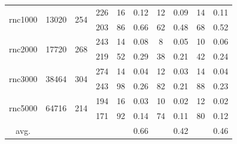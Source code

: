 \documentclass[conference]{IEEEtran}
\begin{document}
\begin{table}[!h]
\begin{tabular}{c|c|c|c|c|c|c|c|c|c}
\hline
\multicolumn{1}{c|}{\multirow{2}{*}{\hspace*{-1em}rnc1000\hspace*{-1em}}}         &\multicolumn{1}{c|}{\multirow{2}{*}{\hspace*{-1em}13020\hspace*{-1em}}}     &\multicolumn{1}{c|}{\multirow{2}{*}{254}}   &226    &16 &0.12  &12   &0.09  &14  &0.11   \\
   &  &   &203   &86  &0.66  &62   &0.48  &68  &0.52 \\

\hline
\multicolumn{1}{c|}{\multirow{2}{*}{\hspace*{-1em}rnc2000\hspace*{-1em}}}       &\multicolumn{1}{c|}{\multirow{2}{*}{\hspace*{-1em}17720\hspace*{-1em}}}       &\multicolumn{1}{c|}{\multirow{2}{*}{268}}    &243    &14  &0.08  &8      &0.05  &10 &0.06   \\
  &  &  &219   &52  &0.29  &38      &0.21  &42 &0.24  \\


\hline
\multicolumn{1}{c|}{\multirow{2}{*}{\hspace*{-1em}rnc3000\hspace*{-1em}}}        &\multicolumn{1}{c|}{\multirow{2}{*}{\hspace*{-1em}38464\hspace*{-1em}}}     &\multicolumn{1}{c|}{\multirow{2}{*}{304}}  &274  &14  &0.04  &12   &0.03   &14   &0.04  \\
   &   &  &243   &98  &0.26   &82 &0.21   &88  &0.23 \\


\hline
\multicolumn{1}{c|}{\multirow{2}{*}{\hspace*{-1em}rnc5000\hspace*{-1em}}}        &\multicolumn{1}{c|}{\multirow{2}{*}{\hspace*{-1em}64716\hspace*{-1em}}}    &\multicolumn{1}{c|}{\multirow{2}{*}{214}}    &194  &16  &0.03  &10  &0.02 &12  &0.02    \\
   &   &  &171   &92   &0.14   &74   &0.11   &80  &0.12  \\
\hline

avg.   &   &  &    &    &0.66   &    &0.42   &   &0.46  \\
\hline
\hline
\end{tabular}
\label{table:VPCTC}
\end{table}
\end{document}
